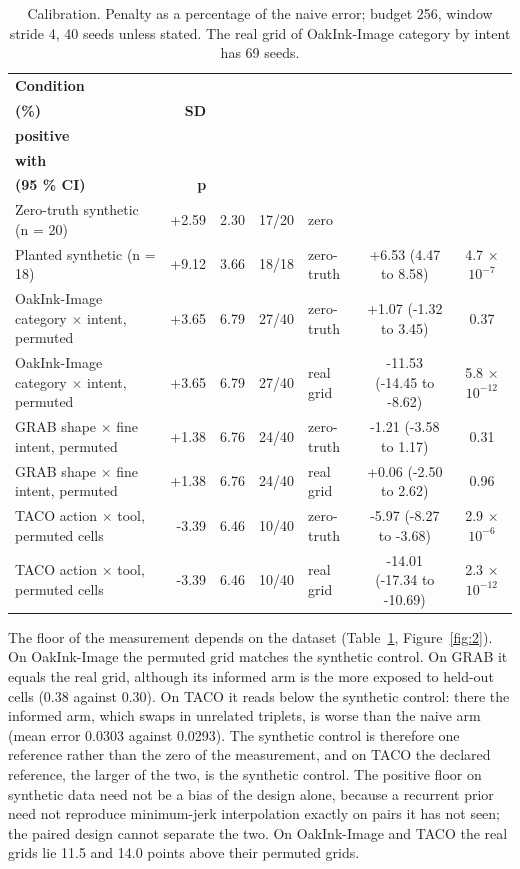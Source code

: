 \documentclass[10pt]{article}
\begin{document}
\begin{table}[t]
\caption{Calibration. Penalty as a percentage of the naive error; budget 256, window stride 4, 40 seeds unless stated. The real grid of OakInk-Image category by intent has 69 seeds.}
\label{tab:1}
\begin{center}
\scriptsize
\setlength{\tabcolsep}{3pt}
\begin{tabular}{p{}rrclcc}
\toprule
\textbf{Condition} & \shortstack{\textbf{Penalty} \\ \textbf{(\%)}} & \textbf{SD} & \shortstack{\textbf{Seeds} \\ \textbf{positive}} & \shortstack{\textbf{Compared} \\ \textbf{with}} & \shortstack{\textbf{Difference} \\ \textbf{(95 \% CI)}} & \textbf{p} \\
\midrule
Zero-truth synthetic (n = 20) & +2.59 & 2.30 & 17/20 & zero &  &  \\
Planted synthetic (n = 18) & +9.12 & 3.66 & 18/18 & zero-truth & +6.53 (4.47 to 8.58) & 4.7 $\times$ $10^{-7}$ \\
OakInk-Image category $\times$ intent, permuted & +3.65 & 6.79 & 27/40 & zero-truth & +1.07 (-1.32 to 3.45) & 0.37 \\
OakInk-Image category $\times$ intent, permuted & +3.65 & 6.79 & 27/40 & real grid & -11.53 (-14.45 to -8.62) & 5.8 $\times$ $10^{-12}$ \\
GRAB shape $\times$ fine intent, permuted & +1.38 & 6.76 & 24/40 & zero-truth & -1.21 (-3.58 to 1.17) & 0.31 \\
GRAB shape $\times$ fine intent, permuted & +1.38 & 6.76 & 24/40 & real grid & +0.06 (-2.50 to 2.62) & 0.96 \\
TACO action $\times$ tool, permuted cells & -3.39 & 6.46 & 10/40 & zero-truth & -5.97 (-8.27 to -3.68) & 2.9 $\times$ $10^{-6}$ \\
TACO action $\times$ tool, permuted cells & -3.39 & 6.46 & 10/40 & real grid & -14.01 (-17.34 to -10.69) & 2.3 $\times$ $10^{-12}$ \\
\bottomrule
\end{tabular}
\end{center}
\end{table}

The floor of the measurement depends on the dataset (Table~\ref{tab:1}, Figure~\ref{fig:2}). On OakInk-Image the permuted grid matches the synthetic control. On GRAB it equals the real grid, although its informed arm is the more exposed to held-out cells (0.38 against 0.30). On TACO it reads below the synthetic control: there the informed arm, which swaps in unrelated triplets, is worse than the naive arm (mean error 0.0303 against 0.0293). The synthetic control is therefore one reference rather than the zero of the measurement, and on TACO the declared reference, the larger of the two, is the synthetic control. The positive floor on synthetic data need not be a bias of the design alone, because a recurrent prior need not reproduce minimum-jerk interpolation exactly on pairs it has not seen; the paired design cannot separate the two. On OakInk-Image and TACO the real grids lie 11.5 and 14.0 points above their permuted grids.
\end{document}

